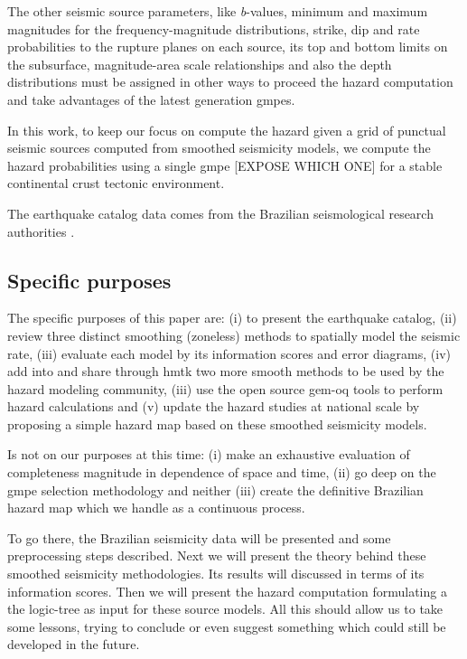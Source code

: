 \documentclass[draft, grl]{agutex}
\begin{document}
\begin{article}
The other seismic source parameters, like \emph{b}-values, minimum and maximum magnitudes for the frequency-magnitude distributions, strike, dip and rate probabilities to the rupture planes on each source, its top and bottom limits on the subsurface, magnitude-area scale relationships and also the depth distributions must be assigned in other ways to proceed the hazard computation and take advantages of the latest generation \glspl{gmpe}.

In this work, to keep our focus on compute the hazard given a grid of punctual seismic sources computed from smoothed seismicity models, we compute the hazard probabilities using a single \gls{gmpe} [EXPOSE WHICH ONE] for a stable continental crust tectonic environment.

The earthquake catalog data comes from the Brazilian seismological research authorities \citep{bsb_2014}.


\subsection{Specific purposes}

The specific purposes of this paper are: 
(i) to present the \citet{bsb_2014} earthquake catalog,
(ii) review three distinct smoothing (zoneless) methods to spatially model the seismic rate,
(iii) evaluate each model by its information scores and error diagrams,
(iv) add into and share through \gls{hmtk} two more smooth methods to be used by the hazard modeling community,
(iii) use the open source \gls{gem}-\glsdesc{oq} tools to perform hazard calculations and
(v) update the hazard studies at national scale by proposing a simple hazard map based on these smoothed seismicity models.

Is not on our purposes at this time: (i) make an exhaustive evaluation of completeness magnitude in dependence of space and time, (ii) go deep on the \gls{gmpe} selection methodology and neither (iii) create the definitive Brazilian hazard map which we handle as a continuous process.

To go there, the Brazilian seismicity data will be presented and some preprocessing steps described. Next we will present the theory behind these smoothed seismicity methodologies. Its results will discussed in terms of its information scores. Then we will present the hazard computation formulating a the logic-tree as input for these source models. All this should allow us to take some lessons, trying to conclude or even suggest something which could still be developed in the future.


\end{article}
\end{document}
